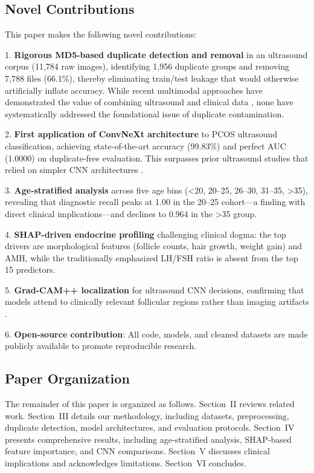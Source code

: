 \documentclass[conference]{IEEEtran}
\begin{document}
\subsection{Novel Contributions}

This paper makes the following novel contributions:

1. \textbf{Rigorous MD5-based duplicate detection and removal} in an ultrasound corpus (11,784 raw images), identifying 1,956 duplicate groups and removing 7,788 files (66.1\%), thereby eliminating train/test leakage that would otherwise artificially inflate accuracy. While recent multimodal approaches have demonstrated the value of combining ultrasound and clinical data \cite{CrossAttention2026}, none have systematically addressed the foundational issue of duplicate contamination.

2. \textbf{First application of ConvNeXt architecture} to PCOS ultrasound classification, achieving state-of-the-art accuracy (99.83\%) and perfect AUC (1.0000) on duplicate-free evaluation. This surpasses prior ultrasound studies that relied on simpler CNN architectures \cite{Hoque2026, SymmetryAware2026}.

3. \textbf{Age‑stratified analysis} across five age bins (<20, 20–25, 26–30, 31–35, >35), revealing that diagnostic recall peaks at 1.00 in the 20–25 cohort—a finding with direct clinical implications—and declines to 0.964 in the >35 group.

4. \textbf{SHAP-driven endocrine profiling} challenging clinical dogma: the top drivers are morphological features (follicle counts, hair growth, weight gain) and AMH, while the traditionally emphasized LH/FSH ratio is absent from the top 15 predictors.

5. \textbf{Grad-CAM++ localization} for ultrasound CNN decisions, confirming that models attend to clinically relevant follicular regions rather than imaging artifacts \cite{Chattopadhyay2018}.

6. \textbf{Open-source contribution}: All code, models, and cleaned datasets are made publicly available to promote reproducible research.

\subsection{Paper Organization}

The remainder of this paper is organized as follows. Section~II reviews related work. Section~III details our methodology, including datasets, preprocessing, duplicate detection, model architectures, and evaluation protocols. Section~IV presents comprehensive results, including age‑stratified analysis, SHAP‑based feature importance, and CNN comparisons. Section~V discusses clinical implications and acknowledges limitations. Section~VI concludes.
\end{document}
